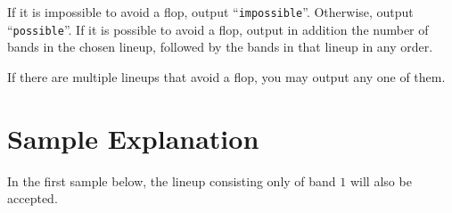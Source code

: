 \begin{Output}
	If it is impossible to avoid a flop, output ``\texttt{impossible}''.
	Otherwise, output ``\texttt{possible}''.
	If it is possible to avoid a flop, output in addition the number of bands in the chosen lineup, followed by the bands in that lineup in any order.
	
    If there are multiple lineups that avoid a flop, you may output any one of them.
\end{Output}

\section*{Sample Explanation}

In the first sample below, the lineup consisting only of band $1$ will also be accepted.

